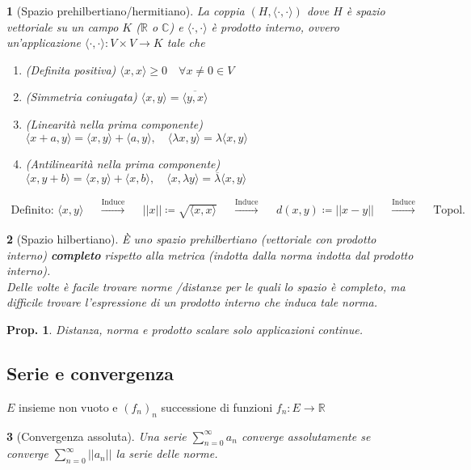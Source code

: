 \documentclass[a4paper,10pt]{article}
\newcommand{\re}{\mathbb{R}} %
\newcommand{\im}{\mathbb{C}} %
\newcommand{\inner}{\langle\cdot{,}\cdot\rangle} %
\newcommand{\inn}[2]{\langle #1, #2 \rangle}
\theoremstyle{indentdefinition}
\theoremstyle{indenttheorem}
\newtheorem{prop}{Prop.}
\theoremstyle{myremark}
\theoremstyle{indentgeneral}
\newtheorem*{gen}{}
\begin{document}
\begin{gen}[Spazio prehilbertiano/hermitiano]
    La coppia $(H, \inner)$ dove $H$ è spazio vettoriale su un campo $K$ ($\re$ o $\im$)  e $\inner$ è prodotto interno, ovvero un'applicazione $\inner: V\times V \to K$ tale che
    \begin{enumerate}
        \item (Definita positiva) $\inn{x}{x}\ge 0 \quad \forall x \ne 0 \in V$
        \item (Simmetria coniugata) $\inn{x}{y}=\overline{\inn{y}{x}}$
        \item (Linearità nella prima componente) $\inn{x+a}{y}=\inn{x}{y}+\inn{a}{y}, \quad \inn{\lambda x}{y}=\lambda\inn{x}{y}$
        \item (Antilinearità nella prima componente) $\inn{x}{y+b}=\inn{x}{y}+\inn{x}{b}, \quad \inn{x}{\lambda y}=\overline{\lambda}\inn{x}{y}$
    \end{enumerate}
    \begin{align*}
        \text{Definito: } \inn{x}{y}  & & \overset{\text{Induce}}{\longrightarrow} 
& & ||x|| \coloneqq \sqrt{\inn{x}{x}} & & \overset{\text{Induce}}{\longrightarrow} & & d(x,y) \coloneqq ||x-y||  & & \overset{\text{Induce}}{\longrightarrow} & & \text{Topol.}
    \end{align*}
\end{gen}

\begin{gen}[Spazio hilbertiano]
    È uno spazio prehilbertiano (vettoriale con prodotto interno) \textbf{completo} rispetto alla metrica (indotta dalla norma indotta dal prodotto interno). \\
    Delle volte è facile trovare norme /distanze per le quali lo spazio è completo, ma difficile trovare l'espressione di un prodotto interno che induca tale norma.
\end{gen}

\begin{prop}
    Distanza, norma e prodotto scalare solo applicazioni continue.
\end{prop}



\subsection{Serie e convergenza}

$E$ insieme non vuoto e $(f_n)_n$ successione di funzioni $f_n: E \to \re$
\begin{gen}[Convergenza assoluta]
    Una serie $\sum_{n=0}^\infty a_n$ converge assolutamente se converge $\sum_{n=0}^\infty ||a_n||$ la serie delle norme.
\end{gen}
\end{document}
